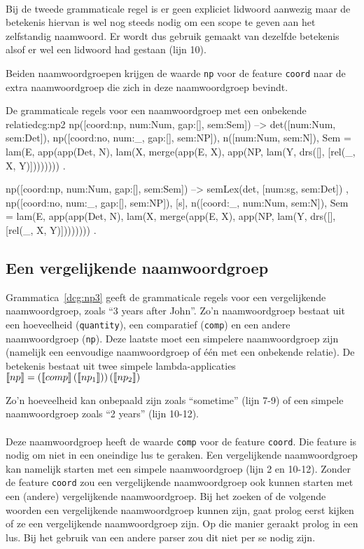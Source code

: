 \paragraph{}Bij de tweede grammaticale regel is er geen expliciet lidwoord aanwezig maar de betekenis hiervan is wel nog steeds nodig om een scope te geven aan het zelfstandig naamwoord. Er wordt dus gebruik gemaakt van dezelfde betekenis alsof er wel een lidwoord had gestaan (lijn 10).

Beiden naamwoordgroepen krijgen de waarde \texttt{np} voor de feature \texttt{coord} naar de extra naamwoordgroep die zich in deze naamwoordgroep bevindt.

\begin{dcg}{De grammaticale regels voor een naamwoordgroep met een onbekende relatie}{dcg:np2}
np([coord:np, num:Num, gap:[], sem:Sem]) -->
  det([num:Num, sem:Det]),
  np([coord:no, num:_, gap:[], sem:NP]),
  n([num:Num, sem:N]),
  { Sem = lam(E, app(app(Det, N), lam(X, merge(app(E, X), app(NP, lam(Y,
    drs([], [rel(_, X, Y)]))))))) }.

np([coord:np, num:Num, gap:[], sem:Sem]) -->
  { semLex(det, [num:sg, sem:Det]) },
  np([coord:no, num:_, gap:[], sem:NP]),
  [s],
  n([coord:_, num:Num, sem:N]),
  { Sem = lam(E, app(app(Det, N), lam(X, merge(app(E, X), app(NP, lam(Y,
    drs([], [rel(_, X, Y)]))))))) }.
\end{dcg}

\subsection{Een vergelijkende naamwoordgroep}
\label{sec:gramNpComp}
Grammatica~\ref{dcg:np3} geeft de grammaticale regels voor een vergelijkende naamwoordgroep, zoals ``3 years after John''. Zo'n naamwoordgroep bestaat uit een hoeveelheid (\texttt{quantity}), een comparatief (\texttt{comp}) en een andere naamwoordgroep (\texttt{np}). Deze laatste moet een simpelere naamwoordgroep zijn (namelijk een eenvoudige naamwoordgroep of één met een onbekende relatie). De betekenis bestaat uit twee simpele lambda-applicaties $\llbracket np\rrbracket = \left( \llbracket comp\rrbracket \left( \llbracket np_1\rrbracket \right) \right) \left( \llbracket np_2\rrbracket \right)$

Zo'n hoeveelheid kan onbepaald zijn zoals ``sometime'' (lijn 7-9) of een simpele naamwoordgroep zoals ``2 years'' (lijn 10-12).

\paragraph{} Deze naamwoordgroep heeft de waarde \texttt{comp} voor de feature \texttt{coord}. Die feature is nodig om niet in een oneindige lus te geraken. Een vergelijkende naamwoordgroep kan namelijk starten met een simpele naamwoordgroep (lijn 2 en 10-12). Zonder de feature \texttt{coord} zou een vergelijkende naamwoordgroep ook kunnen starten met een (andere) vergelijkende naamwoordgroep. Bij het zoeken of de volgende woorden een vergelijkende naamwoordgroep kunnen zijn, gaat prolog eerst kijken of ze een vergelijkende naamwoordgroep zijn. Op die manier geraakt prolog in een lus. Bij het gebruik van een andere parser zou dit niet per se nodig zijn.


